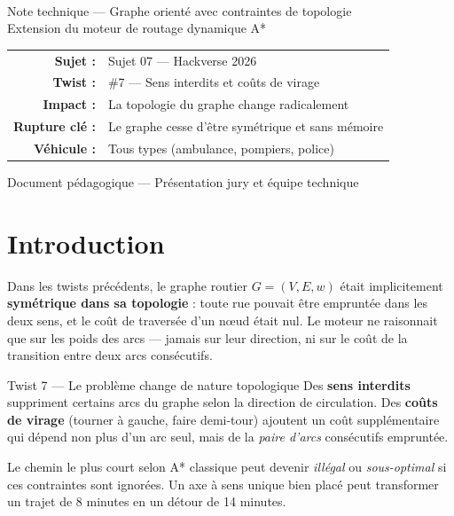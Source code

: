 \documentclass[12pt,a4paper]{article}
\theoremstyle{definition}
\theoremstyle{remark}
\begin{document}
\begin{titlepage}
\\[2em]

  {\large Note technique — Graphe orienté avec contraintes de topologie}\\[1em]
  {\large\color{gray} Extension du moteur de routage dynamique A*}\\[2.5em]

  \begin{tabular}{rl}
    \textbf{Sujet :}    & Sujet 07 — Hackverse 2026 \\
    \textbf{Twist :}    & \#7 — Sens interdits et coûts de virage \\
    \textbf{Impact :}   & La topologie du graphe change radicalement \\
    \textbf{Rupture clé :} & Le graphe cesse d'être symétrique et sans mémoire \\
    \textbf{Véhicule :} & Tous types (ambulance, pompiers, police) \\
  \end{tabular}

  \vfill
  {\small\color{gray} Document pédagogique — Présentation jury et équipe technique}
\end{titlepage}

\tableofcontents
\newpage

\section*{Introduction}

Dans les twists précédents, le graphe routier $G = (V, E, w)$ était implicitement
\textbf{symétrique dans sa topologie} : toute rue pouvait être empruntée dans
les deux sens, et le coût de traversée d'un nœud était nul. Le moteur ne
raisonnait que sur les poids des arcs — jamais sur leur direction, ni sur
le coût de la transition entre deux arcs consécutifs.

\begin{twistbox}{Twist 7 — Le problème change de nature topologique}
Des \textbf{sens interdits} suppriment certains arcs du graphe selon la
direction de circulation. Des \textbf{coûts de virage} (tourner à gauche,
faire demi-tour) ajoutent un coût supplémentaire qui dépend non plus
d'un arc seul, mais de la \emph{paire d'arcs} consécutifs empruntée.

Le chemin le plus court selon A* classique peut devenir \emph{illégal}
ou \emph{sous-optimal} si ces contraintes sont ignorées. Un axe à sens
unique bien placé peut transformer un trajet de 8 minutes en un détour
de 14 minutes.
\end{twistbox}
\end{document}

